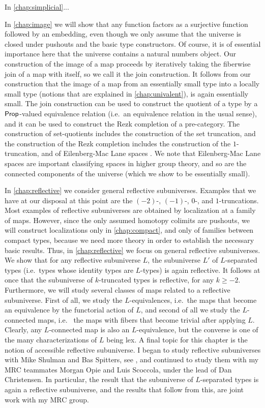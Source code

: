 In \cref{chap:simplicial}...

In \cref{chap:image} we will show that any function factors as a surjective function followed by an embedding, even though we only assume that the universe is closed under pushouts and the basic type constructors. Of course, it is of essential importance here that the universe contains a natural numbers object. Our construction of the image of a map proceeds by iteratively taking the fiberwise join of a map with itself, so we call it the join construction. It follows from our construction that the image of a map from an essentially small type into a locally small type (notions that are explained in \cref{chap:univalent}), is again essentially small. The join construction can be used to construct the quotient of a type by a $\mathsf{Prop}$-valued equivalence relation (i.e.~an equivalence relation in the usual sense), and it can be used to construct the Rezk completion of a pre-category. The construction of set-quotients includes the construction of the set truncation, and the construction of the Rezk completion includes the construction of the $1$-truncation, and of Eilenberg-Mac Lane spaces \cite{FinsterLicata}. We note that Eilenberg-Mac Lane spaces are important classifying spaces in higher group theory, and so are the connected components of the universe (which we show to be essentially small). 

In \cref{chap:reflective} we consider general reflective subuniverses. Examples that we have at our disposal at this point are the $(-2)$-, $(-1)$-, $0$-, and $1$-truncations. Most examples of reflective subuniverses are obtained by localization at a family of maps. However, since the only assumed homotopy colimits are pushouts, we will construct localizations only in \cref{chap:compact}, and only of families between compact types, because we need more theory in order to establish the necessary basic results. Thus, in \cref{chap:reflective} we focus on general reflective subuniverses. We show that for any reflective subuniverse $L$, the subuniverse $L'$ of $L$-separated types (i.e.~types whose identity types are $L$-types) is again reflective. It follows at once that the subuniverse of $k$-truncated types is reflective, for any $k\geq -2$. Furthermore, we will study several classes of maps related to a reflective subuniverse. First of all, we study the $L$-equivalences, i.e.~the maps that become an equivalence by the functorial action of $L$, and second of all we study the $L$-connected maps, i.e.~ the maps with fibers that become trivial after applying $L$. Clearly, any $L$-connected map is also an $L$-equivalence, but the converse is one of the many characterizations of $L$ being lex. A final topic for this chapter is the notion of accessible reflective subuniverse. I began to study reflective subuniverses with Mike Shulman and Bas Spitters, see \cite{RijkeShulmanSpitters}, and continued to study them with my MRC teammates Morgan Opie and Luis Scoccola, under the lead of Dan Christensen. In particular, the result that the subuniverse of $L$-separated types is again a reflective subuniverse, and the results that follow from this, are joint work with my MRC group. 

